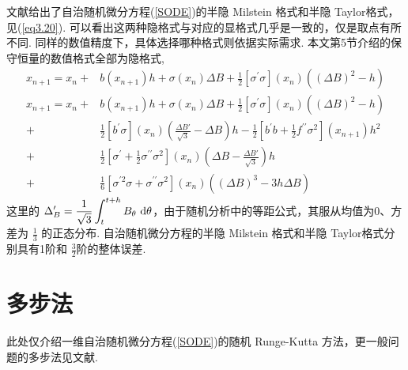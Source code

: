 文献\cite{Implicit_Taylor,Implicit_Taylor_1,Implicit_Taylor_2}给出了自治随机微分方程(\ref{SODE})的半隐 Milstein 格式和半隐 Taylor格式，见(\ref{eq3.20}). 可以看出这两种隐格式与对应的显格式几乎是一致的，仅是取点有所不同. 同样的数值精度下，具体选择哪种格式则依据实际需求. 本文第5节介绍的保守恒量的数值格式全部为隐格式, 
\begin{equation}\label{eq3.20}
\begin{aligned}
x_{n+1} = x_n+&b(x_{n+1})h + \sigma(x_n) \Delta B + \frac12 [\sigma^\prime \sigma] (x_n) ((\Delta B)^2-h) \\
x_{n+1} = x_n+&b(x_{n+1})h + \sigma(x_n) \Delta B + \frac12 [\sigma^\prime \sigma] (x_n) ((\Delta B)^2-h)\\
			 +&\frac{1}{2} [b^{\prime} \sigma](x_n)\left(\frac{\Delta B'}{\sqrt{3}}-\Delta B\right)h
			 -\frac{1}{2}\left[b^{\prime} b+\frac{1}{2} f^{\prime \prime} \sigma^{2}\right](x_{n+1}) h^2\\
			 +&\frac12\left[\sigma^{\prime} +\frac12 \sigma^{\prime \prime} \sigma^{2}\right](x_n)\left(\Delta B-\frac{\Delta B'}{\sqrt{3}}\right) h\\
			 +&\frac{1}{6}\left[\sigma^{\prime 2} \sigma+\sigma^{\prime \prime} \sigma^{2}\right](x_n) (\left(\Delta B\right)^3-3 h \Delta B )
\end{aligned}
\end{equation}
这里的 $\displaystyle \Delta_B' = \frac{1}{\sqrt{3}} \int _t^{t+h} B_\theta \text{ d} \theta$，由于随机分析中的等距公式，其服从均值为0、方差为 $\frac13$ 的正态分布. 
自治随机微分方程的半隐 Milstein 格式和半隐 Taylor格式分别具有1阶和 $\frac32$阶的整体误差. 


\section{多步法}

此处仅介绍一维自治随机微分方程(\ref{SODE})的随机 Runge-Kutta 方法，更一般问题的多步法见文献\cite{book_kutta}.

